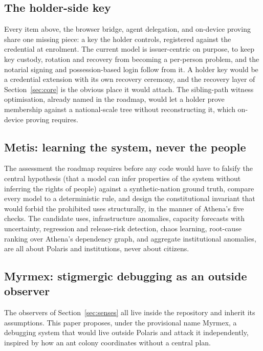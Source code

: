 \subsection{The holder-side key}

Every item above, the browser bridge, agent delegation, and on-device proving share one missing
piece: a key the holder controls, registered against the credential at enrolment. The current model
is issuer-centric on purpose, to keep key custody, rotation and recovery from becoming a per-person
problem, and the notarial signing and possession-based login follow from it. A holder key would be a
credential extension with its own recovery ceremony, and the recovery layer of
Section~\ref{sec:core} is the obvious place it would attach. The sibling-path witness optimisation,
already named in the roadmap, would let a holder prove membership against a national-scale tree
without reconstructing it, which on-device proving requires.

\subsection{Metis: learning the system, never the people}

The assessment the roadmap requires before any code would have to falsify the central hypothesis
(that a model can infer properties of the system without inferring the rights of people) against a
synthetic-nation ground truth, compare every model to a deterministic rule, and design the
constitutional invariant that would forbid the prohibited uses structurally, in the manner of
Athena's five checks. The candidate uses, infrastructure anomalies, capacity forecasts with
uncertainty, regression and release-risk detection, chaos learning, root-cause ranking over Athena's
dependency graph, and aggregate institutional anomalies, are all about Polaris and institutions,
never about citizens.

\subsection{Myrmex: stigmergic debugging as an outside observer}

The observers of Section~\ref{sec:senses} all live inside the repository and inherit its
assumptions. This paper proposes, under the provisional name Myrmex, a debugging system that would
live outside Polaris and attack it independently, inspired by how an ant colony coordinates without
a central plan.

